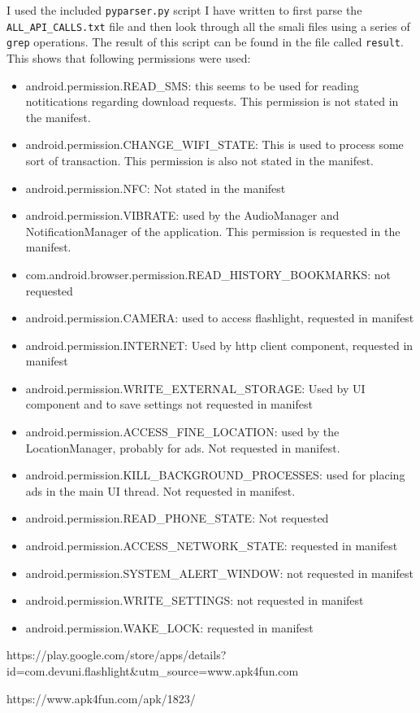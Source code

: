 \documentclass[10pt,a4paper]{article}
\begin{document}
I used the included \texttt{pyparser.py} script I have written to first parse the
\texttt{ALL\_API\_CALLS.txt} file and then look through all the smali files
using a series of \texttt{grep} operations. The result of this script can be
found in the file called \texttt{result}.\\
This shows that following permissions were used:
\begin{itemize}
  \item android.permission.READ\_SMS: this seems to be used for reading
    notitications regarding download requests. This permission is not stated in
    the manifest.
  \item android.permission.CHANGE\_WIFI\_STATE: This is used to process some
    sort of transaction. This permission  is also not
    stated in the manifest.
  \item android.permission.NFC: Not stated in the manifest
  \item android.permission.VIBRATE: used by the AudioManager and
    NotificationManager of the application. This permission is requested in the
    manifest.
  \item com.android.browser.permission.READ\_HISTORY\_BOOKMARKS: not requested
  \item android.permission.CAMERA: used to access flashlight, requested in
    manifest
  \item android.permission.INTERNET: Used by http client component, requested in
    manifest
  \item android.permission.WRITE\_EXTERNAL\_STORAGE: Used by UI component and to
    save settings not requested in manifest
  \item android.permission.ACCESS\_FINE\_LOCATION: used by the LocationManager,
    probably for ads. Not requested in manifest.
  \item android.permission.KILL\_BACKGROUND\_PROCESSES: used for placing ads in
    the main UI thread. Not requested in manifest.
  \item  android.permission.READ\_PHONE\_STATE: Not requested
  \item android.permission.ACCESS\_NETWORK\_STATE: requested in manifest 
  \item android.permission.SYSTEM\_ALERT\_WINDOW: not requested in manifest 

  \item android.permission.WRITE\_SETTINGS: not requested in manifest 

  \item android.permission.WAKE\_LOCK: requested in manifest 

  
\end{itemize}

\begin{thebibliography}{9}
  
  https://play.google.com/store/apps/details?id=com.devuni.flashlight\&utm\_source=www.apk4fun.com

  https://www.apk4fun.com/apk/1823/
\end{thebibliography}
\end{document}
